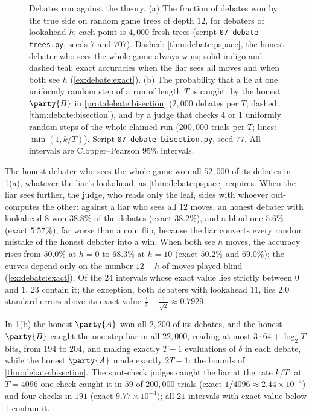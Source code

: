 \begin{refsection}
\begin{figure}[t]
\caption{Debates run against the theory. (a) The fraction of debates won by the true side on random game trees of depth $12$, for debaters of lookahead $h$; each point is $4{,}000$ fresh trees (script \texttt{07-debate-trees.py}, seeds $7$ and $707$). Dashed: \cref{thm:debate:pspace}, the honest debater who sees the whole game always wins; solid indigo and dashed teal: exact accuracies when the liar sees all moves and when both see $h$ (\cref{ex:debate:exact}). (b) The probability that a lie at one uniformly random step of a run of length $T$ is caught: by the honest $\party{B}$ in \cref{prot:debate:bisection} ($2{,}000$ debates per $T$; dashed: \cref{thm:debate:bisection}), and by a judge that checks $4$ or $1$ uniformly random steps of the whole claimed run ($200{,}000$ trials per $T$; lines: $\min(1,k/T)$). Script \texttt{07-debate-bisection.py}, seed $77$. All intervals are Clopper--Pearson $95\%$ intervals.}\label{fig:debate:runs}
\end{figure}

The honest debater who sees the whole game won all $52{,}000$ of its debates in \cref{fig:debate:runs}(a), whatever the liar's lookahead, as \cref{thm:debate:pspace} requires. When the liar sees further, the judge, who reads only the leaf, sides with whoever out-computes the other: against a liar who sees all $12$ moves, an honest debater with lookahead $8$ won $38.8\%$ of the debates (exact $38.2\%$), and a blind one $5.6\%$ (exact $5.57\%$), far worse than a coin flip, because the liar converts every random mistake of the honest debater into a win. When both see $h$ moves, the accuracy rises from $50.0\%$ at $h=0$ to $68.3\%$ at $h=10$ (exact $50.2\%$ and $69.0\%$); the curves depend only on the number $12-h$ of moves played blind (\cref{ex:debate:exact}). Of the $24$ intervals whose exact value lies strictly between $0$ and $1$, $23$ contain it; the exception, both debaters with lookahead $11$, lies $2.0$ standard errors above its exact value $\frac32-\frac1{\sqrt2}\approx0.7929$.

In \cref{fig:debate:runs}(b) the honest $\party{A}$ won all $2{,}200$ of its debates, and the honest $\party{B}$ caught the one-step liar in all $22{,}000$, reading at most $3\cdot64+\log_2T$ bits, from $194$ to $204$, and making exactly $T-1$ evaluations of $\delta$ in each debate, while the honest $\party{A}$ made exactly $2T-1$: the bounds of \cref{thm:debate:bisection}. The spot-check judges caught the liar at the rate $k/T$: at $T=4096$ one check caught it in $59$ of $200{,}000$ trials (exact $1/4096\approx2.44\times10^{-4}$) and four checks in $191$ (exact $9.77\times10^{-4}$); all $21$ intervals with exact value below $1$ contain it.


\end{refsection}
